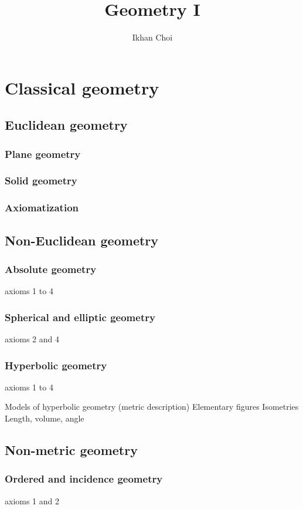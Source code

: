 \documentclass{../../large}
\begin{document}
\title{Geometry I}
\author{Ikhan Choi}
\maketitle
\tableofcontents

\part{Classical geometry}
\chapter{Euclidean geometry}

\section{Plane geometry}
\section{Solid geometry}
\section{Axiomatization}

\chapter{Non-Euclidean geometry}
\section{Absolute geometry}
axioms 1 to 4
\section{Spherical and elliptic geometry}
axioms 2 and 4
\section{Hyperbolic geometry}
axioms 1 to 4

Models of hyperbolic geometry (metric description)
Elementary figures
Isometries
Length, volume, angle

\chapter{Non-metric geometry}
\section{Ordered and incidence geometry}
axioms 1 and 2
\end{document}
